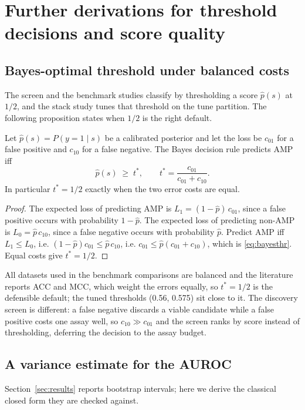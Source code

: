 
\section{Further derivations for threshold decisions and score quality}
\label{app:math3}

\subsection{Bayes-optimal threshold under balanced costs}
The screen and the benchmark studies classify by thresholding a score
$\hat p(s)$ at $1/2$, and the stack study tunes that threshold on the tune
partition. The following proposition states when $1/2$ is the right
default.

\begin{proposition}\label{prop:bayes-thr}
Let $\hat p(s) = P(y{=}1 \mid s)$ be a calibrated posterior and let the
loss be $c_{01}$ for a false positive and $c_{10}$ for a false negative.
The Bayes decision rule predicts AMP iff
\begin{equation}
\hat p(s) \;\ge\; t^{*}, \qquad
t^{*} = \frac{c_{01}}{c_{01} + c_{10}}.
\label{eq:bayesthr}
\end{equation}
In particular $t^{*} = 1/2$ exactly when the two error costs are equal.
\end{proposition}
\begin{proof}
The expected loss of predicting AMP is
$L_1 = (1-\hat p)\,c_{01}$, since a false positive occurs with
probability $1-\hat p$. The expected loss of predicting non-AMP is
$L_0 = \hat p\,c_{10}$, since a false negative occurs with probability
$\hat p$. Predict AMP iff $L_1 \le L_0$, i.e.
$(1-\hat p)c_{01} \le \hat p\, c_{10}$, i.e.
$c_{01} \le \hat p(c_{01} + c_{10})$, which is
\eqref{eq:bayesthr}. Equal costs give $t^{*} = 1/2$.
\end{proof}

\begin{remark}
All datasets used in the benchmark comparisons are balanced and the
literature reports ACC and MCC, which weight the errors equally, so
$t^{*}=1/2$ is the defensible default; the tuned thresholds (0.56, 0.575)
sit close to it. The discovery screen is different: a false negative
discards a viable candidate while a false positive costs one assay well,
so $c_{10} \gg c_{01}$ and the screen ranks by score instead of
thresholding, deferring the decision to the assay budget.
\end{remark}

\subsection{A variance estimate for the AUROC}
Section~\ref{sec:results} reports bootstrap intervals; here we derive the
classical closed form they are checked against.

